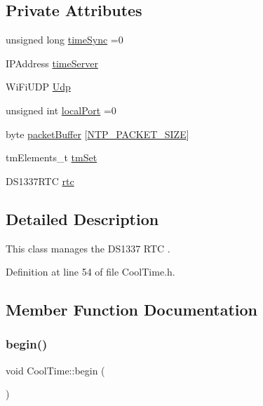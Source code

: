 \subsection*{Private Attributes}
\begin{DoxyCompactItemize}
\item 
unsigned long \hyperlink{class_cool_time_a9d032e76c3470a15b3bbbc52af6463f7}{time\+Sync} =0
\item 
I\+P\+Address \hyperlink{class_cool_time_ad2b9858f399108cb440dd1e908916f04}{time\+Server}
\item 
Wi\+Fi\+U\+DP \hyperlink{class_cool_time_a4e23216a8121ca79d0fb019f30884b92}{Udp}
\item 
unsigned int \hyperlink{class_cool_time_a2f777da44d7ba678be8185299e9b49d1}{local\+Port} =0
\item 
byte \hyperlink{class_cool_time_a27e6abc82a5c2f72161956967005bec7}{packet\+Buffer} \mbox{[}\hyperlink{_cool_time_8h_a56a6ea64006651b4f42adf713e244f06}{N\+T\+P\+\_\+\+P\+A\+C\+K\+E\+T\+\_\+\+S\+I\+ZE}\mbox{]}
\item 
tm\+Elements\+\_\+t \hyperlink{class_cool_time_ad33c2713c903ff064ad09c46406ae088}{tm\+Set}
\item 
D\+S1337\+R\+TC \hyperlink{class_cool_time_abd38f2384ff90692b1568d9db869412e}{rtc}
\end{DoxyCompactItemize}


\subsection{Detailed Description}
This class manages the D\+S1337 R\+TC . 

Definition at line 54 of file Cool\+Time.\+h.



\subsection{Member Function Documentation}
\mbox{\label{class_cool_time_ab1976cf718b950bc31e003c3323b8adb}} 
\subsubsection{\texorpdfstring{begin()}{begin()}}
{\footnotesize\ttfamily void Cool\+Time\+::begin (\begin{DoxyParamCaption}{ }\end{DoxyParamCaption})}

